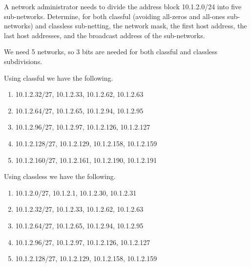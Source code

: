 \begin{Exercise}
A network administrator needs to divide the address block 10.1.2.0/24 into five sub-networks.
Determine, for both classful (avoiding all-zeros and all-ones sub-networks) and classless sub-netting, the network mask, the first host address, the last host addresses, and the broadcast address of the sub-networks.
\end{Exercise}
\begin{Answer}
We need 5 networks, so 3 bits are needed for both classful and classless subdivisions.

Using classful we have the following.
\begin{enumerate}
\item 10.1.2.32/27, 10.1.2.33, 10.1.2.62, 10.1.2.63
\item 10.1.2.64/27, 10.1.2.65, 10.1.2.94, 10.1.2.95
\item 10.1.2.96/27, 10.1.2.97, 10.1.2.126, 10.1.2.127
\item 10.1.2.128/27, 10.1.2.129, 10.1.2.158, 10.1.2.159
\item 10.1.2.160/27, 10.1.2.161, 10.1.2.190, 10.1.2.191
\end{enumerate}

Using classless we have the following.
\begin{enumerate}
\item 10.1.2.0/27, 10.1.2.1, 10.1.2.30, 10.1.2.31
\item 10.1.2.32/27, 10.1.2.33, 10.1.2.62, 10.1.2.63
\item 10.1.2.64/27, 10.1.2.65, 10.1.2.94, 10.1.2.95
\item 10.1.2.96/27, 10.1.2.97, 10.1.2.126, 10.1.2.127
\item 10.1.2.128/27, 10.1.2.129, 10.1.2.158, 10.1.2.159
\end{enumerate}
\end{Answer}

